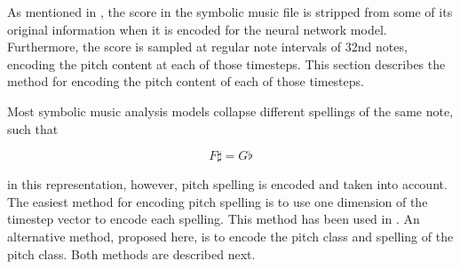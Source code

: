 
As mentioned in , the score in
the symbolic music file is stripped from some of its
original information when it is encoded for the neural
network model. Furthermore, the score is sampled at regular
note intervals of 32nd notes, encoding the pitch content at
each of those timesteps. This section describes the method
for encoding the pitch content of each of those timesteps. 

Most symbolic music analysis models collapse different
spellings of the same note, such that 

$$F\sharp = G\flat$$

in this representation, however, pitch spelling is encoded
and taken into account. The easiest method for encoding
pitch spelling is to use one dimension of the timestep
vector to encode each spelling. This method has been used in
\textcite{micchi2020not, micchi2021deep}. An alternative
method, proposed here, is to encode the pitch class and
spelling of the pitch class. Both methods are described
next.
